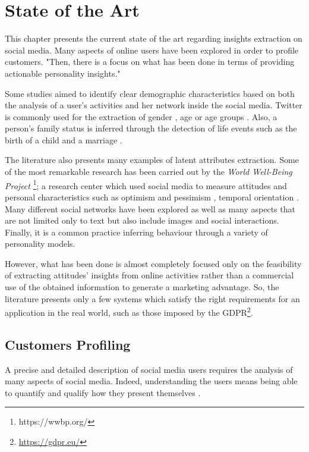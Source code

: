 \chapter{State of the Art}
This chapter presents the current state of the art regarding insights extraction on social media.
Many aspects of online users have been explored in order to profile customers.
"Then, there is a focus on what has been done in terms of providing actionable personality insights."

Some studies aimed to identify clear demographic characteristics based on both the analysis of a user's activities and her network inside the social media. 
Twitter is commonly used for the extraction of gender \cite{miller2012gender}, age or age groups \cite{culotta2015predicting}.
Also, a person's family status is inferred through the detection of life events such as the birth of a child and a marriage \cite{dickinson2015identifying}.


The literature also presents many examples of latent attributes extraction.
Some of the most remarkable research has been carried out by the \emph{World Well-Being Project} \footnote{https://wwbp.org/}; a research center which used 
social media to measure attitudes and personal characteristics such as optimism and pessimism \cite{ruan2016finding}, temporal orientation \cite{schwartz2015extracting}.
Many different social networks have been explored as well as many aspects that are not limited only to text but also include images and social interactions.
Finally, it is a common practice inferring behaviour through a variety of personality models.

However, what has been done is almost completely focused only on the feasibility of extracting attitudes' insights from online activities rather than a commercial use of the obtained information to generate a marketing advantage.
So, the literature presents only a few systems which satisfy the right requirements for an application in the real world, such as those imposed by the GDPR\footnote{\url{https://gdpr.eu/}}.

\section{Customers Profiling}
A precise and detailed description of social media users requires the analysis of many aspects of social media. 
Indeed, understanding the users means being able to quantify and qualify how they present themselves \cite{schwartz2013personality}.

